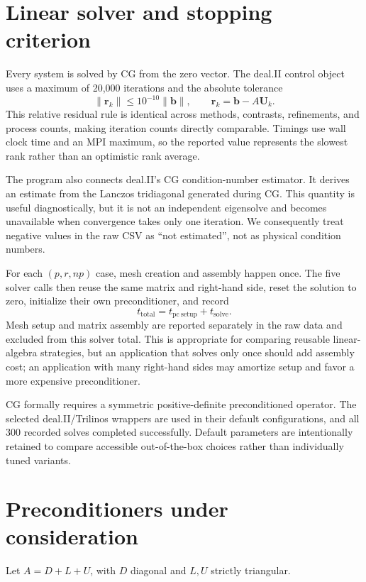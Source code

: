 \documentclass[10pt,a4paper]{article}
\begin{document}
\newpage
\section{Linear solver and stopping criterion}
Every system is solved by CG from the zero vector. The deal.II control object uses a maximum of
20,000 iterations and the absolute tolerance
\begin{equation}
 \|\boldsymbol r_k\|\le10^{-10}\|\boldsymbol b\|,
 \qquad \boldsymbol r_k=\boldsymbol b-A\boldsymbol U_k.
 \label{eq:stopping}
\end{equation}
This relative residual rule is identical across methods, contrasts, refinements, and process counts,
making iteration counts directly comparable. Timings use wall clock time and an MPI maximum, so
the reported value represents the slowest rank rather than an optimistic rank average.

The program also connects deal.II's CG condition-number estimator. It derives an estimate from
the Lanczos tridiagonal generated during CG. This quantity is useful diagnostically, but it is not
an independent eigensolve and becomes unavailable when convergence takes only one iteration.
We consequently treat negative values in the raw CSV as ``not estimated'', not as physical
condition numbers.

For each $(p,r,np)$ case, mesh creation and assembly happen once. The five solver calls then reuse
the same matrix and right-hand side, reset the solution to zero, initialize their own preconditioner,
and record
\begin{equation}
 t_{\mathrm{total}}=t_{\mathrm{pc\ setup}}+t_{\mathrm{solve}}.
\end{equation}
Mesh setup and matrix assembly are reported separately in the raw data and excluded from this
solver total. This is appropriate for comparing reusable linear-algebra strategies, but an application
that solves only once should add assembly cost; an application with many right-hand sides may
amortize setup and favor a more expensive preconditioner.

CG formally requires a symmetric positive-definite preconditioned operator. The selected
deal.II/Trilinos wrappers are used in their default configurations, and all 300 recorded solves
completed successfully. Default parameters are intentionally retained to compare accessible
out-of-the-box choices rather than individually tuned variants.

\newpage
\section{Preconditioners under consideration}
Let $A=D+L+U$, with $D$ diagonal and $L,U$ strictly triangular.
\end{document}
